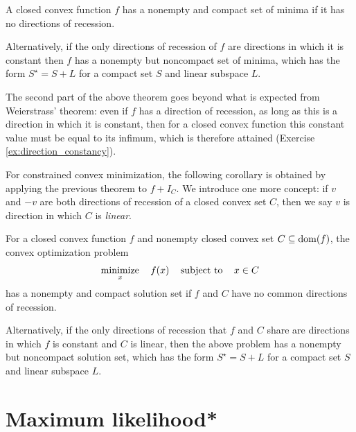 \begin{Theorem}
\label{thm:weierstrass_convex}
A closed convex function $f$ has a nonempty and compact set of minima if it 
has no directions of recession. 

\setlength{\parindent}{\normalparindent}
Alternatively, if the only directions of recession of $f$ are directions in
which it is constant then $f$ has a nonempty but noncompact set of minima, which
has the form $S^\star = S + L$ for a compact set $S$ and linear subspace $L$.  
\end{Theorem}

The second part of the above theorem goes beyond what is expected from 
Weierstrass' theorem: even if $f$ has a direction of recession, as long as this
is a direction in which it is constant, then for a closed convex function this
constant value must be equal to its infimum, which is therefore attained
(Exercise \ref{ex:direction_constancy}).  

For constrained convex minimization, the following corollary is obtained by
applying the previous theorem to $f + I_C$. We introduce one more concept: if
$v$ and $-v$ are both directions of recession of a closed convex set $C$, then
we say $v$ is direction in which $C$ is \emph{linear}.

\begin{Corollary}
For a closed convex function $f$ and nonempty closed convex set $C \subseteq 
\operatorname{dom}(f)$, the convex optimization problem    
\[
\operatorname*{minimize}_x \quad f(x) \quad \operatorname{subject\,\,to} \quad x \in C
\]
has a nonempty and compact solution set if $f$ and $C$ have no common 
directions of recession. 

\setlength{\parindent}{\normalparindent}
Alternatively, if the only directions of recession that $f$ and $C$ share are
directions in which $f$ is constant and $C$ is linear, then the above problem
has a nonempty but noncompact solution set, which has the form $S^\star = S + L$
for a compact set $S$ and linear subspace $L$.   
\end{Corollary}

\section{Maximum likelihood*}
\label{sec:maximum_likelihood}

